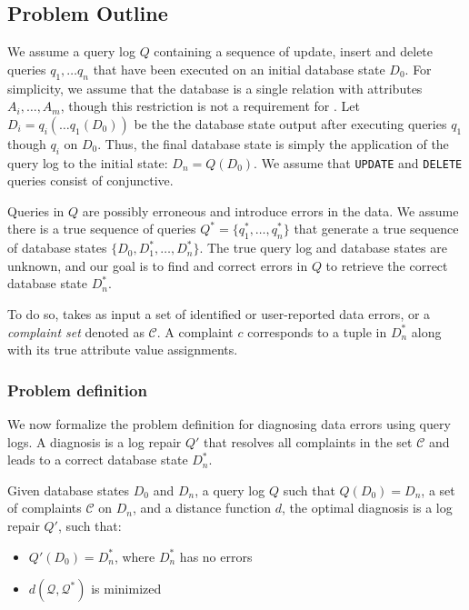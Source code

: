 \subsection{Problem Outline}

We assume a query log $Q$ containing a sequence of update, insert and delete queries 
$q_1, \ldots q_n$  that have been executed on an initial database state $D_0$.  
For simplicity, we assume that the database is a single relation with attributes 
$A_i,\ldots,A_m$, though this restriction is not a requirement for \sys.
Let $D_i = q_i(\ldots q_1(D_0))$ be the the database state output after executing queries $q_1$ though $q_i$ on $D_0$.
Thus, the final database state is simply the application of the query log to
the initial state: $D_n = Q(D_0)$.
We assume that \texttt{UPDATE} and \texttt{DELETE} queries consist of conjunctive.

Queries in $Q$ are possibly erroneous and introduce errors in the data.  We assume there is 
a true sequence of queries $Q^* = \{q^*_1,\ldots,q^*_n\}$ that generate a true sequence of database states
$\{D_0, D^*_1,\ldots,D^*_n\}$.  The true query log and database states are unknown, and our goal is to 
find and correct errors in $Q$ to retrieve the correct database state $D^*_n$.

To do so, \sys takes as input a set of identified or user-reported
data errors, or a {\it complaint set} denoted as $\mathcal{C}$. 
A complaint $c$ corresponds to a tuple in $D^*_n$ along with its true attribute value assignments.  



\subsubsection*{Problem definition}

We now formalize the problem definition for diagnosing data
errors using query logs. A diagnosis is a log repair
$Q'$ that resolves all complaints in the set $\mathcal{C}$
and leads to a correct database state $D_n^*$.

\begin{definition}\label{def:problem}
    Given database states $D_0$ and $D_n$, a query log $Q$ 
    such that $Q(D_0)=D_n$, a set of complaints $\mathcal{C}$ on $D_n$,  
    and a distance function $d$, the optimal diagnosis is a 
    log repair $Q'$, such that:
    \begin{itemize}[itemsep=0pt, parsep=0pt]
        \item $Q'(D_0)=D_n^*$, where $D_n^*$ has no errors
        \item $d(\mathcal{Q}, \mathcal{Q}^*)$ is minimized
    \end{itemize}
\end{definition}

